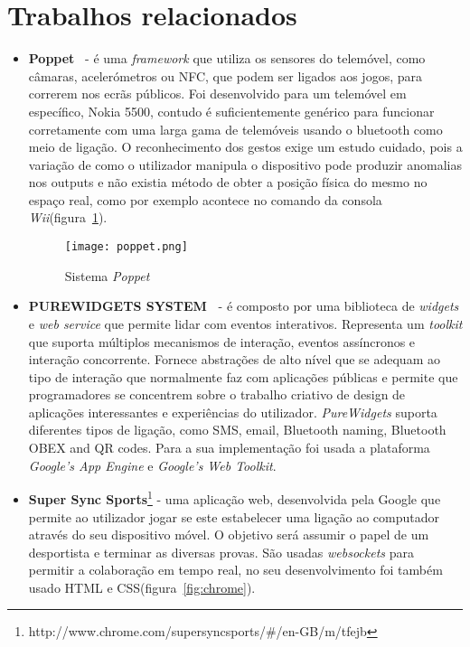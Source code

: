 \section{Trabalhos relacionados}
\begin{itemize}
\item \textbf{Poppet}~\cite{Vajk2008b} - é uma \textit{framework} que utiliza os sensores do telemóvel, como câmaras, acelerómetros ou NFC, que podem ser ligados aos jogos, para correrem nos ecrãs públicos. Foi desenvolvido para um telemóvel em específico, Nokia 5500, contudo é suficientemente genérico para funcionar corretamente com uma larga gama de telemóveis usando o bluetooth como meio de ligação. O reconhecimento dos gestos exige um estudo cuidado, pois a variação de como o utilizador manipula o dispositivo pode produzir anomalias nos outputs e não existia método de obter a posição física do mesmo no espaço real, como por exemplo acontece no comando da consola \textit{Wii}(figura~\ref{fig:poppet}).

\begin{figure}[ht]
\centering
\texttt{[image: poppet.png]}
\caption[Sistema \textit{Poppet}] {Sistema \textit{Poppet}~\cite{Vajk2008b}}
\label{fig:poppet}
\end{figure}

\item \textbf{PUREWIDGETS SYSTEM~\cite{Cardoso2012g}} - é composto por uma biblioteca de \textit{widgets} e \textit{web service} que permite lidar com eventos interativos. Representa um \textit{toolkit} que suporta múltiplos mecanismos de interação, eventos assíncronos e interação concorrente. Fornece abstrações de alto nível que se adequam ao tipo de interação que normalmente faz com aplicações públicas e permite que programadores se concentrem sobre o trabalho criativo de design de aplicações interessantes e experiências do utilizador. \textit{PureWidgets} suporta diferentes tipos de ligação, como SMS, email, Bluetooth naming, Bluetooth OBEX and QR codes. Para a sua implementação foi usada a plataforma \textit{Google’s App Engine} e \textit{Google’s Web Toolkit}.


\item \textbf{Super Sync Sports}\footnote{http://www.chrome.com/supersyncsports/\#/en-GB/m/tfejb} -  uma aplicação web, desenvolvida pela Google que permite ao utilizador jogar se este estabelecer uma ligação ao computador através do seu dispositivo móvel. O objetivo será assumir o papel de um desportista e terminar as diversas provas. São usadas \textit{websockets} para permitir a colaboração em tempo real, no seu desenvolvimento foi também usado HTML e CSS(figura~\ref{fig:chrome}).


\end{itemize}
